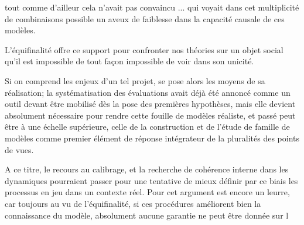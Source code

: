 tout comme d'ailleur cela n'avait pas convaincu ...  qui voyait dans cet multiplicité de combinaisons possible un aveux de faiblesse dans la capacité causale de ces modèles. 





L'équifinalité offre ce support pour confronter nos théories sur un objet social qu'il est impossible de tout façon impossible de voir dans son unicité.


Si on comprend les enjeux d'un tel projet, se pose alors les moyens de sa réalisation; la systématisation des évaluations avait déjà été annoncé comme un outil devant être mobilisé dès la pose des premières hypothèses, mais elle devient absolument nécessaire pour rendre cette fouille de modèles réaliste, et passé peut être à une échelle supérieure, celle de la construction et de l'étude de famille de modèles comme premier élément de réponse intégrateur de la pluralités des points de vues.

A ce titre, le recours au calibrage, et la recherche de cohérence interne dans les dynamiques pourraient passer pour une tentative de mieux définir par ce biais les processus en jeu dans un contexte réel. Pour \autocite{OSullivan2004} cet argument est encore un leurre, car toujours au vu de l'équifinalité, si ces procédures améliorent bien la connaissance du modèle, absolument aucune garantie ne peut être donnée sur l